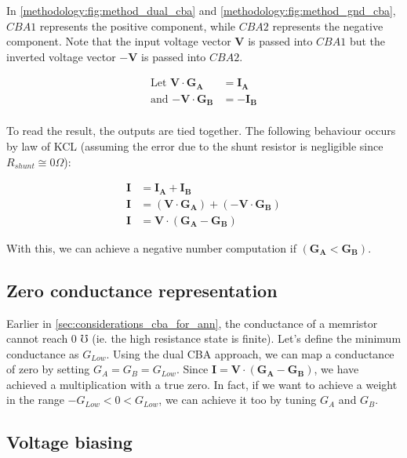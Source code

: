 \noindent
In \autoref{methodology:fig:method_dual_cba} and \autoref{methodology:fig:method_gnd_cba}, $CBA1$ represents the positive component, while $CBA2$ represents the negative component. Note that the input voltage vector $\mathbf{V}$ is passed into $CBA1$ but the inverted voltage vector $\mathbf{-V}$ is passed into $CBA2$. 

$$
\begin{aligned}
\text{Let }
\mathbf{V} \cdot \mathbf{G_A} &= \mathbf{I_A} \\
\text{and }
\mathbf{-V} \cdot \mathbf{G_B} &= -\mathbf{I_B} \\
\end{aligned}
$$

\noindent
To read the result, the outputs are tied together. The following behaviour occurs by law of \ac{KCL} (assuming the error due to the shunt resistor is negligible since $R_{shunt} \cong 0 \Omega$):

$$
\begin{aligned}
\mathbf{I} &= \mathbf{I_A} + \mathbf{I_B} \\
\mathbf{I} &= \left(\mathbf{V} \cdot \mathbf{G_A}\right) + \left(\mathbf{-V} \cdot \mathbf{G_B}\right) \\
\mathbf{I} &= \mathbf{V} \cdot \left(\mathbf{G_A} - \mathbf{G_B}\right)
\end{aligned}
$$

\noindent
With this, we can achieve a negative number computation if $\left(\mathbf{G_A} < \mathbf{G_B}\right)$.

\subsection{Zero conductance representation}

Earlier in \autoref{sec:considerations_cba_for_ann}, the conductance of a memristor cannot reach 0 $\mho$ (ie. the high resistance state is finite). Let's define the minimum conductance as $G_{Low}$. Using the dual \ac{CBA} approach, we can map a conductance of zero by setting ${G_A} = {G_B} = G_{Low}$. Since $\mathbf{I} = \mathbf{V} \cdot \left(\mathbf{G_A} - \mathbf{G_B}\right)$, we have achieved a multiplication with a true zero. In fact, if we want to achieve a weight in the range $-G_{Low} < 0 < G_{Low}$, we can achieve it too by tuning $G_A$ and $G_B$.

\subsection{Voltage biasing}


